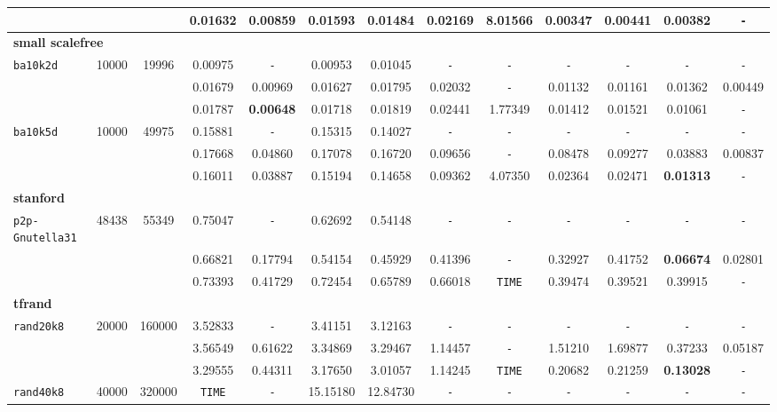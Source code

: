 \begin{table}
{\begin{tabular}{ l c c | c c c c c c c c c c }
 &  &  & 0.01632 & 0.00859 & 0.01593 & 0.01484 & 0.02169 & 8.01566 & \textbf{0.00347} & 0.00441 & 0.00382 & \verb|-| \\
\hline
\multicolumn{13}{l}{\textbf{small scalefree}} \\
\hline
\verb|ba10k2d| & 10000 & 19996 & 0.00975 & \verb|-| & 0.00953 & 0.01045 & \verb|-| & \verb|-| & \verb|-| & \verb|-| & \verb|-| & \verb|-| \\
 &  &  & 0.01679 & 0.00969 & 0.01627 & 0.01795 & 0.02032 & \verb|-| & 0.01132 & 0.01161 & 0.01362 & 0.00449 \\
 &  &  & 0.01787 & \textbf{0.00648} & 0.01718 & 0.01819 & 0.02441 & 1.77349 & 0.01412 & 0.01521 & 0.01061 & \verb|-| \\
\hline
\verb|ba10k5d| & 10000 & 49975 & 0.15881 & \verb|-| & 0.15315 & 0.14027 & \verb|-| & \verb|-| & \verb|-| & \verb|-| & \verb|-| & \verb|-| \\
 &  &  & 0.17668 & 0.04860 & 0.17078 & 0.16720 & 0.09656 & \verb|-| & 0.08478 & 0.09277 & 0.03883 & 0.00837 \\
 &  &  & 0.16011 & 0.03887 & 0.15194 & 0.14658 & 0.09362 & 4.07350 & 0.02364 & 0.02471 & \textbf{0.01313} & \verb|-| \\
\hline
\multicolumn{13}{l}{\textbf{stanford}} \\
\hline
\verb|p2p-Gnutella31| & 48438 & 55349 & 0.75047 & \verb|-| & 0.62692 & 0.54148 & \verb|-| & \verb|-| & \verb|-| & \verb|-| & \verb|-| & \verb|-| \\
 &  &  & 0.66821 & 0.17794 & 0.54154 & 0.45929 & 0.41396 & \verb|-| & 0.32927 & 0.41752 & \textbf{0.06674} & 0.02801 \\
 &  &  & 0.73393 & 0.41729 & 0.72454 & 0.65789 & 0.66018 & \verb|TIME| & 0.39474 & 0.39521 & 0.39915 & \verb|-| \\
\hline
\multicolumn{13}{l}{\textbf{tfrand}} \\
\hline
\verb|rand20k8| & 20000 & 160000 & 3.52833 & \verb|-| & 3.41151 & 3.12163 & \verb|-| & \verb|-| & \verb|-| & \verb|-| & \verb|-| & \verb|-| \\
 &  &  & 3.56549 & 0.61622 & 3.34869 & 3.29467 & 1.14457 & \verb|-| & 1.51210 & 1.69877 & 0.37233 & 0.05187 \\
 &  &  & 3.29555 & 0.44311 & 3.17650 & 3.01057 & 1.14245 & \verb|TIME| & 0.20682 & 0.21259 & \textbf{0.13028} & \verb|-| \\
\hline
\verb|rand40k8| & 40000 & 320000 & \verb|TIME| & \verb|-| & 15.15180 & 12.84730 & \verb|-| & \verb|-| & \verb|-| & \verb|-| & \verb|-| & \verb|-| \\

\end{tabular}}
\end{table}
